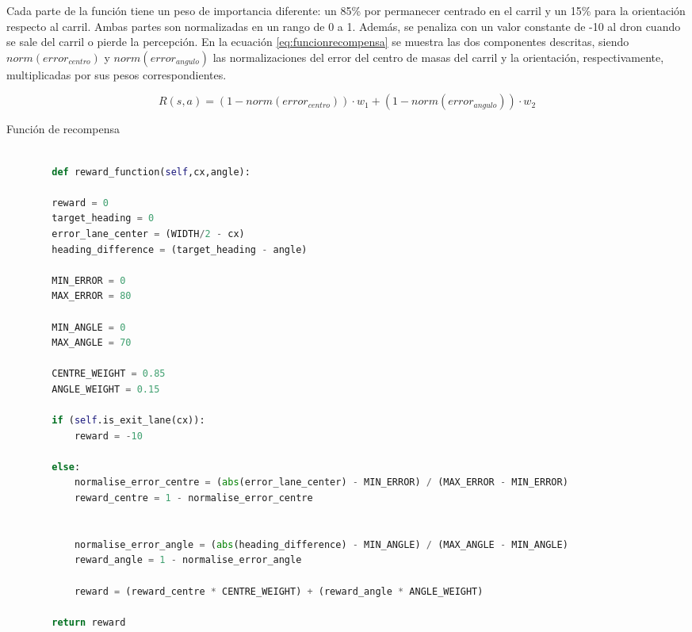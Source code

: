 \begin{itemize}
    Cada parte de la función tiene un peso de importancia diferente: un 85\% por permanecer centrado en el carril y un 15\% para la orientación respecto al carril. Ambas partes 
    son normalizadas en un rango de 0 a 1. Además, se penaliza con un valor constante de -10 al dron cuando se sale del carril o pierde la percepción. En la ecuación 
    \ref{eq:funcionrecompensa} se muestra las dos componentes descritas, siendo $norm(error_{centro})$ y $norm(error_{angulo})$ las normalizaciones del error del centro de 
    masas del carril y la orientación, respectivamente, multiplicadas por sus pesos correspondientes.

      \begin{myequation}[H]
        \begin{equation}
          R(s,a) = (1 - norm(error_{centro})) \cdot w_{1} + 
          (1 - norm(error_{angulo})) \cdot w_{2}
          \label{eq:funcionrecompensa}
        \end{equation}
        \caption{Función de recompensa}
      \end{myequation}

   
    \begin{code}[H]
      \begin{lstlisting}[language=Python]
  
        def reward_function(self,cx,angle):

        reward = 0
        target_heading = 0
        error_lane_center = (WIDTH/2 - cx)
        heading_difference = (target_heading - angle) 
        
        MIN_ERROR = 0
        MAX_ERROR = 80

        MIN_ANGLE = 0
        MAX_ANGLE = 70

        CENTRE_WEIGHT = 0.85
        ANGLE_WEIGHT = 0.15
        
        if (self.is_exit_lane(cx)):
            reward = -10

        else:
            normalise_error_centre = (abs(error_lane_center) - MIN_ERROR) / (MAX_ERROR - MIN_ERROR)
            reward_centre = 1 - normalise_error_centre

            
            normalise_error_angle = (abs(heading_difference) - MIN_ANGLE) / (MAX_ANGLE - MIN_ANGLE)
            reward_angle = 1 - normalise_error_angle

            reward = (reward_centre * CENTRE_WEIGHT) + (reward_angle * ANGLE_WEIGHT)
            
        return reward
       

\end{lstlisting}
\end{code}
\end{itemize}
